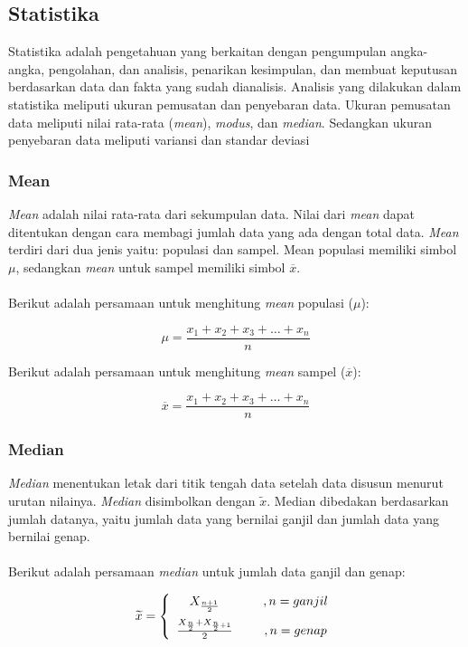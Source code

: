 \subsection{Statistika}
Statistika adalah pengetahuan yang berkaitan dengan pengumpulan angka-angka, pengolahan, dan analisis, penarikan kesimpulan, dan membuat keputusan berdasarkan data dan fakta yang sudah dianalisis. Analisis yang dilakukan dalam statistika meliputi ukuran pemusatan dan penyebaran data. Ukuran pemusatan data meliputi nilai rata-rata (\textit{mean}), \textit{modus}, dan \textit{median}. Sedangkan ukuran penyebaran data meliputi variansi dan standar deviasi

\subsubsection{Mean}
\textit{Mean} adalah nilai rata-rata dari sekumpulan data. Nilai dari \textit{mean} dapat ditentukan dengan cara membagi jumlah data yang ada dengan total data. \textit{Mean} terdiri dari dua jenis yaitu: populasi dan sampel. Mean populasi memiliki simbol $\mu$, sedangkan \textit{mean} untuk sampel memiliki simbol $\overline{x}$.   
\\\\
Berikut adalah persamaan untuk menghitung \textit{mean} populasi ($\mu$):

\begin{equation}
\mu = \frac{x_1+x_2+x_3+\ldots+x_n}{n}
\end{equation}

\noindent Berikut adalah persamaan untuk menghitung \textit{mean} sampel ($\overline{x}$):

\begin{equation}
\overline{x} = \frac{x_1+x_2+x_3+\ldots+x_n}{n}
\end{equation}


\subsubsection{Median}
\textit{Median} menentukan letak dari titik tengah data setelah data disusun menurut urutan nilainya. \textit{Median} disimbolkan dengan $\widetilde x$. Median dibedakan  berdasarkan jumlah datanya, yaitu jumlah data yang bernilai ganjil dan jumlah data yang bernilai genap. 
\\\\
\noindent Berikut adalah persamaan \textit{median} untuk jumlah data ganjil dan genap:

\begin{align}
\widetilde x = 
\left\{ \begin{array}{cc} 
X_{\frac{n+1}{2}} & \hspace{5mm} ,n=ganjil \vspace{2mm}\\
\frac{X_{\frac{n}{2}}+X_{\frac{n}{2}+1}}{2}  & \hspace{5mm} ,n=genap \\
 \end{array} 
 \right.
\end{align}

